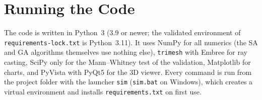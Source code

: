 \appendix
\renewcommand{\appendixtocname}{Appendix}
\renewcommand{\appendixpagename}{\appendixtocname}
\addappheadtotoc
{}
\appendixpage

\chapter{Running the Code}
\label{app:code}

The code is written in Python~3 (3.9 or newer; the validated environment of
\texttt{requirements-lock.txt} is Python~3.11). It uses NumPy for all numerics (the \ac{SA} and
\ac{GA} algorithms themselves use nothing else), \texttt{trimesh} with Embree for ray casting, SciPy only for the
Mann--Whitney test of the validation, Matplotlib for charts, and PyVista with PyQt5 for the 3D
viewer. Every command is run from the project folder with the launcher \texttt{sim}
(\texttt{sim.bat} on Windows), which creates a virtual environment and installs
\texttt{requirements.txt} on first use.


